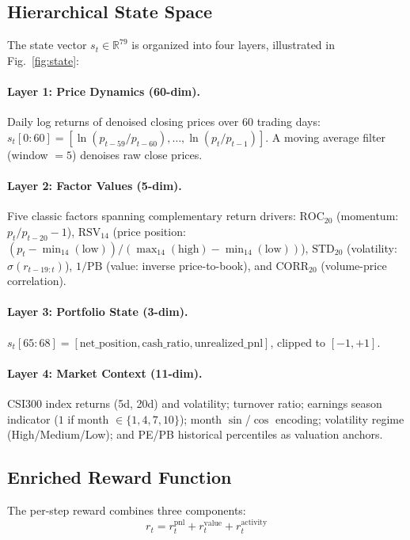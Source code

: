 \documentclass[11pt,a4paper]{article}
\begin{document}
\subsection{Hierarchical State Space}
\label{sec:state}

The state vector $s_t \in \mathbb{R}^{79}$ is organized into four layers, illustrated in Fig.~\ref{fig:state}:

\paragraph{Layer 1: Price Dynamics (60-dim).}
Daily log returns of denoised closing prices over 60 trading days: $s_t[0:60] = [\ln(p_{t-59}/p_{t-60}), \ldots, \ln(p_t/p_{t-1})]$. A moving average filter (window $=5$) denoises raw close prices.

\paragraph{Layer 2: Factor Values (5-dim).}
Five classic factors spanning complementary return drivers: $\text{ROC}_{20}$ (momentum: $p_t/p_{t-20}-1$), $\text{RSV}_{14}$ (price position: $(p_t - \min_{14}(\text{low}))/(\max_{14}(\text{high}) - \min_{14}(\text{low}))$), $\text{STD}_{20}$ (volatility: $\sigma(r_{t-19:t})$), $1/\text{PB}$ (value: inverse price-to-book), and $\text{CORR}_{20}$ (volume-price correlation).

\paragraph{Layer 3: Portfolio State (3-dim).}
$s_t[65:68] = [\text{net\_position}, \text{cash\_ratio}, \text{unrealized\_pnl}]$, clipped to $[-1, +1]$.

\paragraph{Layer 4: Market Context (11-dim).}
CSI300 index returns (5d, 20d) and volatility; turnover ratio; earnings season indicator ($1$ if month $\in \{1,4,7,10\}$); month $\sin$/$\cos$ encoding; volatility regime (High/Medium/Low); and PE/PB historical percentiles as valuation anchors.

\subsection{Enriched Reward Function}
\label{sec:reward}

The per-step reward combines three components:
\begin{equation}
    r_t = r^{\text{pnl}}_t + r^{\text{value}}_t + r^{\text{activity}}_t
\end{equation}
\end{document}
